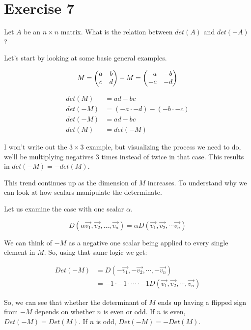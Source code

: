 \section*{Exercise 7}

Let $A$ be an $n \times n$ matrix. What is the relation between $det(A)$ and $det(-A)$?

Let's start by looking at some basic general examples. 

\[
	M =  \begin{pmatrix} a&b\\c&d \end{pmatrix} 
	-M =  \begin{pmatrix} -a&-b\\-c&-d \end{pmatrix} 
\]

\[
	\begin{aligned}
		det(M) &= ad-bc \\
		det(-M) &= (-a \cdot -d) - (-b \cdot -c) \\
		det(-M) &= ad-bc \\
		det(M) &= det(-M)
	\end{aligned}
\]

I won't write out the $3 \times 3$ example, but visualizing the process we need to do, we'll be multiplying negatives 3 times instead of twice in that case. This results in $det(-M) = -det(M)$. 

This trend continues up as the dimension of $M$ increases. To understand why we can look at how scalars manipulate the determinate.

Let us examine the case with one scalar $\alpha$.

\[D(\alpha\vec{v_1}, \vec{v_2}, \dots, \vec{v_n}) = \alpha D(\vec{v_1}, \vec{v_2}, \cdots \vec{v_n})\]

We can think of $-M$ as a negative one scalar being applied to every single element in $M$. So, using that same logic we get:

\[
	\begin{aligned}
	Det(-M) &= D(-\vec{v_1}, -\vec{v_2}, \cdots, -\vec{v_n}) \\
	&= -1 \cdot -1 \cdot \cdots \cdot -1 D(\vec{v_1}, \vec{v_2}, \cdots, \vec{v_n}) 
	\end{aligned}
\]

So, we can see that whether the determinant of $M$ ends up having a flipped sign from $-M$ depends on whether $n$ is even or odd. If $n$ is even, $Det(-M) = Det(M)$. If $n$ is odd, $Det(-M) = -Det(M)$.

